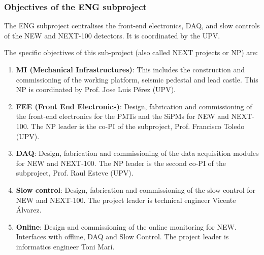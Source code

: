 %
%

\subsubsection*{Objectives of the ENG subproject}

The ENG subproject centralises the front-end electronics, DAQ, and slow controls of the NEW and NEXT-100 detectors. It is coordinated by the UPV.

The specific objectives of this sub-project (also called NEXT projects or NP) are:

\begin{enumerate}
\item {\bf MI (Mechanical Infrastructures)}: This includes the construction and commissioning of the working platform, seismic pedestal and lead castle. This NP is coordinated by Prof. Jose Luis P\'erez (UPV). 
\item {\bf FEE (Front End Electronics)}: Design, fabrication and commissioning of the front-end electronics for the PMTs and the SiPMs for NEW and NEXT-100. The NP leader is the co-PI of the subproject, Prof. Francisco Toledo (UPV).
\item {\bf DAQ}: Design, fabrication and commissioning of the data acquisition modules for NEW and NEXT-100. The NP leader is the second co-PI of the subproject, Prof. Raul Esteve (UPV).
\item {\bf Slow control}: Design, fabrication and commissioning of the slow control for NEW and NEXT-100. The project leader is technical engineer Vicente Álvarez.
\item {\bf Online}: Design and commissioning of the online monitoring for NEW. Interfaces with offline, DAQ and Slow Control. The project leader is 
informatics engineer Toni Mar\'i.
\end{enumerate}

